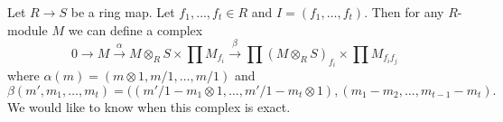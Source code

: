 Let $R \to S$ be a ring map.
Let $f_1, \ldots, f_t \in R$ and $I = (f_1, \ldots, f_t)$.
Then for any $R$-module $M$ we can define a complex
\begin{equation}
\label{equation-glueing-complex}
0 \to M \xrightarrow{\alpha}
M \otimes_R S \times \prod M_{f_i} \xrightarrow{\beta}
\prod (M \otimes_R S)_{f_i}
\times
\prod M_{f_if_j}
\end{equation}
where $\alpha(m) = (m \otimes 1, m/1, \ldots, m/1)$ and
$$
\beta(m', m_1, \ldots, m_t) =
((m'/1 - m_1 \otimes 1, \ldots, m'/1 - m_t \otimes 1),
(m_1 - m_2, \ldots, m_{t - 1} - m_t).
$$
We would like to know when this complex is exact.

